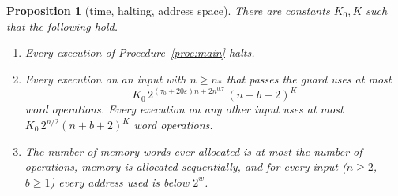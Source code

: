 \documentclass[11pt]{article}
\newtheorem{proposition}[lemma]{Proposition}
\theoremstyle{definition}
\newcommand{\eps}{\varepsilon}
\begin{document}
\begin{proposition}[time, halting, address space]\label{prop:time}
There are constants $K_0,K$ such that the following hold.
\begin{enumerate}[label=\textup{(\alph*)}]
\item Every execution of Procedure~\ref{proc:main} halts.
\item Every execution on an input with $n\ge n_\ast$ that passes the guard uses at most
\begin{equation}\label{eq:alltime}
 K_0\,2^{(\tau_0+20\eps)n+2n^{0.7}}\,(n+b+2)^{K}
\end{equation}
word operations. Every execution on any other input uses at most $K_0\,2^{n/2}(n+b+2)^K$ word operations.
\item The number of memory words ever allocated is at most the number of operations, memory is allocated
sequentially, and for every input ($n\ge2$, $b\ge1$) every address used is below $2^{w}$.
\end{enumerate}
\end{proposition}
\end{document}
